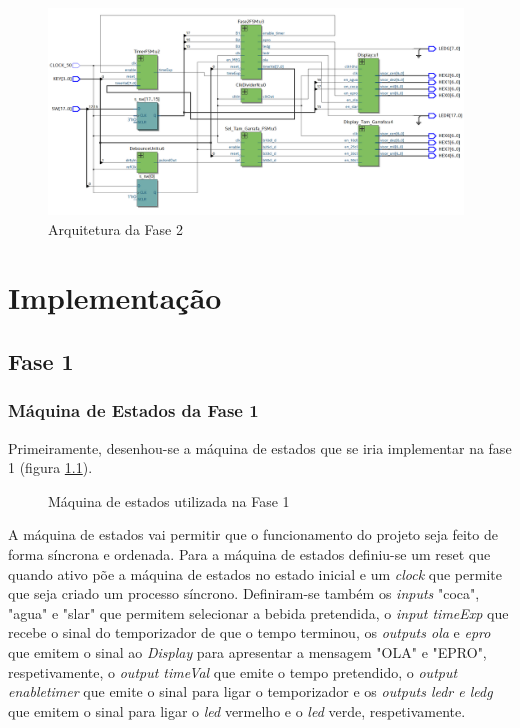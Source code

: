 \documentclass{report}
\begin{document}
\begin{figure}[H]
    \centering
    \includegraphics[width = 11cm]{ArquiteturaFase2.png}
    \caption{Arquitetura da Fase 2}
    \label{fig:Fase2Estrutura}
\end{figure}
 


\chapter{Implementação}
\label{chap.implementação}

\section{Fase 1}

\subsection{Máquina de Estados da Fase 1}

Primeiramente, desenhou-se a máquina de estados que se iria implementar na fase 1 (figura \ref{fig:Fase1FSM}). 

\begin{figure}[H]
    \centering
    \caption{Máquina de estados utilizada na Fase 1}
    \label{fig:Fase1FSM}
\end{figure}

A máquina de estados vai permitir que o funcionamento do projeto seja feito de forma síncrona e ordenada. Para a máquina de estados definiu-se um reset que quando ativo põe a máquina de estados no estado inicial e um \textit{clock} que permite que seja criado um processo síncrono. Definiram-se também os \textit{inputs} "coca", "agua" e "slar" que permitem selecionar a bebida pretendida, o \textit{input timeExp} que recebe o sinal do temporizador de que o tempo terminou, os \textit{outputs ola} e \textit{epro} que emitem o sinal ao \textit{Display} para apresentar a mensagem "OLA" e "EPRO", respetivamente, o \textit{output timeVal} que emite o tempo pretendido, o \textit{output enable\textunderscore timer} que emite o sinal para ligar o temporizador e os \textit{outputs ledr e ledg} que emitem o sinal para ligar o \textit{led} vermelho e o \textit{led} verde, respetivamente.
\end{document}
